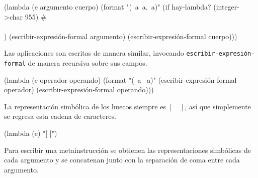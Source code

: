 \documentclass[10pt,oneside,openany,letterpaper]{book}
\begin{document}
\nwenddocs{}\endmoddef
(lambda (e argumento cuerpo)
  (format "(~a~a.~a)"
          (if hay-lambda? (integer->char 955) #\\\\)
          (escribir-expresión-formal argumento)
          (escribir-expresión-formal cuerpo)))
\nwendcode{}\nwdocspar

Las aplicaciones son escritas de manera similar, invocando {\tt{}\protect{}escribir-expresión-formal} de manera recursiva sobre sus campos.

\nwenddocs{}\endmoddef
(lambda (e operador operando)
  (format "(~a ~a)"
          (escribir-expresión-formal operador)
          (escribir-expresión-formal operando)))
\nwendcode{}\nwdocspar

La representación simbólica de los huecos siempre es \( [\quad ] \), así que simplemente se regresa esta cadena de caracteres.

\nwenddocs{}\endmoddef
(lambda (e) "[ ]")
\nwendcode{}\nwdocspar

Para escribir una metainstrucción se obtienen las representaciones simbólicas de cada argumento y se concatenan junto con la separación de coma entre cada argumento.
\end{document}
